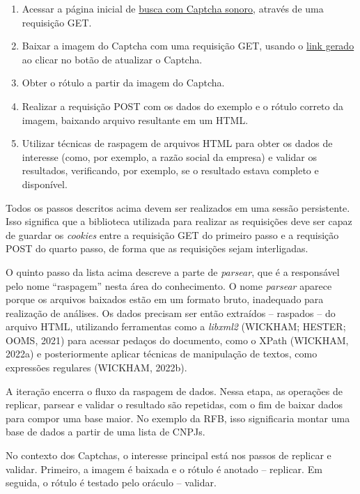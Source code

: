 \documentclass[12pt,twoside,brazilian]{book}
\providecommand{\tightlist}{%
  \setlength{\itemsep}{0pt}\setlength{\parskip}{0pt}}
\begin{document}
\begin{enumerate}
\def\labelenumi{\arabic{enumi}.}
\tightlist
\item
  Acessar a página inicial de
  \href{http://servicos.receita.fazenda.gov.br/Servicos/cnpjreva/Cnpjreva_Solicitacao_CS.asp}{busca
  com Captcha sonoro}, através de uma requisição GET.
\item
  Baixar a imagem do Captcha com uma requisição GET, usando o
  \href{http://servicos.receita.fazenda.gov.br/Servicos/cnpjreva/captcha/gerarCaptcha.asp}{link
  gerado} ao clicar no botão de atualizar o Captcha.
\item
  Obter o rótulo a partir da imagem do Captcha.
\item
  Realizar a requisição POST com os dados do exemplo e o rótulo correto
  da imagem, baixando arquivo resultante em um HTML.
\item
  Utilizar técnicas de raspagem de arquivos HTML para obter os dados de
  interesse (como, por exemplo, a razão social da empresa) e validar os
  resultados, verificando, por exemplo, se o resultado estava completo e
  disponível.
\end{enumerate}

Todos os passos descritos acima devem ser realizados em uma sessão
persistente. Isso significa que a biblioteca utilizada para realizar as
requisições deve ser capaz de guardar os \emph{cookies} entre a
requisição GET do primeiro passo e a requisição POST do quarto passo, de
forma que as requisições sejam interligadas.

O quinto passo da lista acima descreve a parte de \emph{parsear}, que é
a responsável pelo nome ``raspagem'' nesta área do conhecimento. O nome
\emph{parsear} aparece porque os arquivos baixados estão em um formato
bruto, inadequado para realização de análises. Os dados precisam ser
então extraídos -- raspados -- do arquivo HTML, utilizando ferramentas
como a \emph{libxml2} (WICKHAM; HESTER; OOMS, 2021) para acessar pedaços
do documento, como o XPath (WICKHAM, 2022a) e posteriormente aplicar
técnicas de manipulação de textos, como expressões regulares (WICKHAM,
2022b).

A iteração encerra o fluxo da raspagem de dados. Nessa etapa, as
operações de replicar, parsear e validar o resultado são repetidas, com
o fim de baixar dados para compor uma base maior. No exemplo da RFB,
isso significaria montar uma base de dados a partir de uma lista de
CNPJs.

No contexto dos Captchas, o interesse principal está nos passos de
replicar e validar. Primeiro, a imagem é baixada e o rótulo é anotado --
replicar. Em seguida, o rótulo é testado pelo oráculo -- validar.
\end{document}
